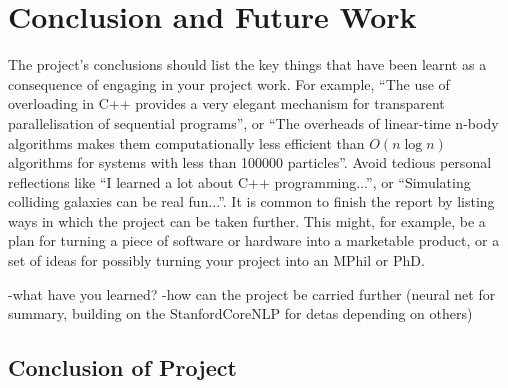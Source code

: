 \chapter{Conclusion and Future Work}

The project's conclusions should list the key things that have been learnt as a consequence of engaging in your project work. For example, ``The use of overloading in C++ provides a very elegant mechanism for transparent parallelisation of sequential programs'', or ``The overheads of linear-time n-body algorithms makes them computationally less efficient than $O(n \log n)$ algorithms for systems with less than 100000 particles''. Avoid tedious personal reflections like ``I learned a lot about C++ programming...'', or ``Simulating colliding galaxies can be real fun...''. It is common to finish the report by listing ways in which the project can be taken further. This might, for example, be a plan for turning a piece of software or hardware into a marketable product, or a set of ideas for possibly turning your project into an MPhil or PhD.

-what have you learned?
-how can the project be carried further (neural net for summary, building on the StanfordCoreNLP for detas depending on others)
\section{Conclusion of Project}
